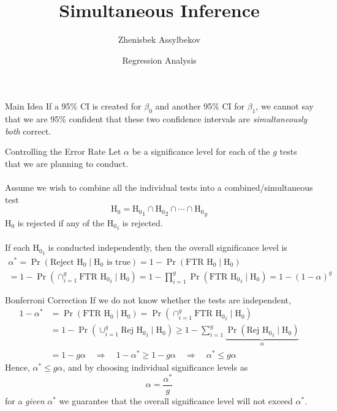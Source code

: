 \documentclass{beamer}
\title{Simultaneous Inference}
\author{Zhenisbek Assylbekov}
\institute{Department of Mathematics}
\date{Regression Analysis}
\begin{document}
\begin{frame}
  \titlepage
\end{frame}

\begin{frame}{Main Idea}
If a 95\% CI is created for $\beta_0$ and another 95\% CI for $\beta_1$, \pause we cannot say that we are 95\% confident that these two confidence intervals are \textit{simultaneously both} correct.
\end{frame}

\begin{frame}{Controlling the Error Rate}
Let $\alpha$ be a significance level for each of the $g$ tests that we are planning to conduct.\\~\\

\pause Assume we wish to combine all the individual tests into a combined/simultaneous test
$$
\mathrm{H}_0={\mathrm{H}_0}_1\cap{\mathrm{H}_0}_2\cap\cdots\cap{\mathrm{H}_0}_g
$$
\pause $\mathrm{H}_0$ is rejected if any of the ${\mathrm{H}_0}_i$ is rejected.\\~\\

\pause If each ${\mathrm{H}_0}_i$ is conducted independently, then the overall significance level is
\begin{multline*}
\alpha^\ast=\Pr(\text{Reject }\mathrm{H}_0\mid\mathrm{H}_0\text{ is true})=1-\Pr(\text{FTR }\mathrm{H}_0\mid\mathrm{H}_0)\\
=1-\Pr(\cap_{i=1}^g\text{FTR }{\mathrm{H}_0}_i\mid\mathrm{H}_0)=1-\prod_{i=1}^g\Pr(\text{FTR }{\mathrm{H}_0}_i\mid\mathrm{H}_0)=1-(1-\alpha)^g
\end{multline*}
\end{frame}

\begin{frame}{Bonferroni Correction}
If we do not know whether the tests are independent,
\begin{align*}
1-\alpha^\ast&=\Pr(\text{FTR }\mathrm{H}_0\mid\mathrm{H}_0)=\Pr(\cap_{i=1}^g\text{FTR }{\mathrm{H}_0}_i\mid\mathrm{H}_0)\\
&=1-\Pr(\cup_{i=1}^g \text{Rej }{\mathrm{H}_0}_i\mid\mathrm{H}_0)
\ge1-\sum_{i=1}^g\underbrace{\Pr(\text{Rej }{\mathrm{H}_0}_i\mid\mathrm{H}_0)}_{\alpha}\\
&=1-g\alpha\quad\Rightarrow\quad1-\alpha^\ast\ge1-g\alpha\quad\Rightarrow\quad\alpha^\ast\le g\alpha
\end{align*}
\pause Hence, $\alpha^\ast\le g\alpha$, and by choosing individual significance levels as
$$
\boxed{\alpha=\frac{\alpha^\ast}{g}}
$$
for a \textit{given} $\alpha^\ast$ we guarantee that the overall significance level will not exceed $\alpha^\ast$.
\end{frame}
\end{document}
